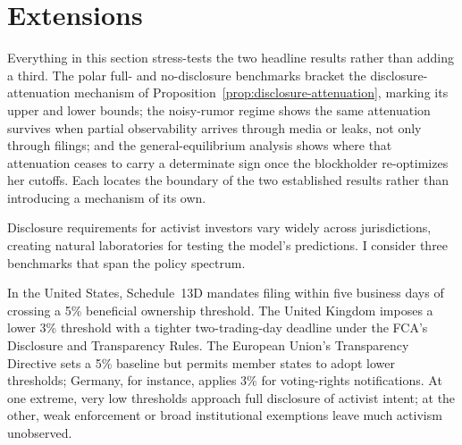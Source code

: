 \documentclass[11pt]{article}
\newcommand{\1}{\mathbf{1}}
\begin{document}
\section{Extensions}
\label{sec:extensions}

Everything in this section stress-tests the two headline results rather than adding a third. The polar full- and no-disclosure benchmarks bracket the disclosure-attenuation mechanism of Proposition~\ref{prop:disclosure-attenuation}, marking its upper and lower bounds; the noisy-rumor regime shows the same attenuation survives when partial observability arrives through media or leaks, not only through filings; and the general-equilibrium analysis shows where that attenuation ceases to carry a determinate sign once the blockholder re-optimizes her cutoffs. Each locates the boundary of the two established results rather than introducing a mechanism of its own.

Disclosure requirements for activist investors vary widely across jurisdictions, creating natural laboratories for testing the model's predictions. I consider three benchmarks that span the policy spectrum.

In the United States, Schedule~13D mandates filing within five business days of crossing a 5\% beneficial ownership threshold. The United Kingdom imposes a lower 3\% threshold with a tighter two-trading-day deadline under the FCA's Disclosure and Transparency Rules. The European Union's Transparency Directive sets a 5\% baseline but permits member states to adopt lower thresholds; Germany, for instance, applies 3\% for voting-rights notifications. At one extreme, very low thresholds approach full disclosure of activist intent; at the other, weak enforcement or broad institutional exemptions leave much activism unobserved.

\bigskip
\end{document}
